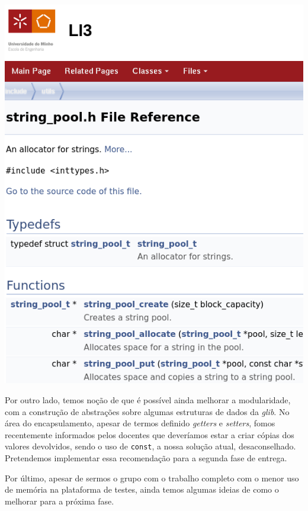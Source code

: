 \documentclass[12pt, a4paper]{article}
\begin{document}
\begin{center}
    \includegraphics[scale=0.3]{res/doxygen.png}
\end{center}

Por outro lado, temos noção de que é possível ainda melhorar a modularidade, com a construção de
abstrações sobre algumas estruturas de dados da \emph{glib}. No área do encapsulamento, apesar de
termos definido \emph{getters} e \emph{setters}, fomos recentemente informados pelos docentes que
deveríamos estar a criar cópias dos valores devolvidos, sendo o uso de \texttt{const}, a nossa
solução atual, desaconselhado. Pretendemos implementar essa recomendação para a segunda fase de
entrega.

Por último, apesar de sermos o grupo com o trabalho completo com o menor uso de memória na
plataforma de testes, ainda temos algumas ideias de como o melhorar para a próxima fase.
\end{document}
